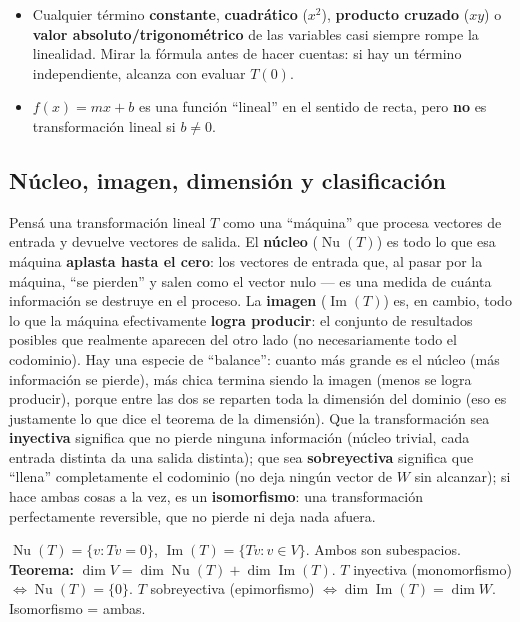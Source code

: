 \documentclass[11pt,a4paper]{article}
\begin{document}
\begin{atencion}
\begin{itemize}
    \item Cualquier término \textbf{constante}, \textbf{cuadrático} ($x^2$), \textbf{producto
    cruzado} ($xy$) o \textbf{valor absoluto/trigonométrico} de las variables casi siempre
    rompe la linealidad. Mirar la fórmula antes de hacer cuentas: si hay un término
    independiente, alcanza con evaluar $T(0)$.
    \item $f(x)=mx+b$ es una función ``lineal'' en el sentido de recta, pero \textbf{no}
    es transformación lineal si $b\neq0$.
\end{itemize}
\end{atencion}

\newpage
\subsection{Núcleo, imagen, dimensión y clasificación}

\begin{intuicion}
Pensá una transformación lineal $T$ como una ``máquina'' que procesa vectores de entrada
y devuelve vectores de salida. El \textbf{núcleo} ($\operatorname{Nu}(T)$) es todo lo que
esa máquina \textbf{aplasta hasta el cero}: los vectores de entrada que, al pasar por la
máquina, ``se pierden'' y salen como el vector nulo — es una medida de cuánta información
se destruye en el proceso. La \textbf{imagen} ($\operatorname{Im}(T)$) es, en cambio, todo
lo que la máquina efectivamente \textbf{logra producir}: el conjunto de resultados
posibles que realmente aparecen del otro lado (no necesariamente todo el codominio). Hay
una especie de ``balance'': cuanto más grande es el núcleo (más información se pierde),
más chica termina siendo la imagen (menos se logra producir), porque entre las dos se
reparten toda la dimensión del dominio (eso es justamente lo que dice el teorema de la
dimensión). Que la transformación sea \textbf{inyectiva} significa que no pierde ninguna
información (núcleo trivial, cada entrada distinta da una salida distinta); que sea
\textbf{sobreyectiva} significa que ``llena'' completamente el codominio (no deja ningún
vector de $W$ sin alcanzar); si hace ambas cosas a la vez, es un \textbf{isomorfismo}: una
transformación perfectamente reversible, que no pierde ni deja nada afuera.
\end{intuicion}

\begin{teoria}
$\operatorname{Nu}(T)=\{v: Tv=0\}$, $\operatorname{Im}(T)=\{Tv: v\in V\}$. Ambos son
subespacios. \textbf{Teorema:} $\dim V=\dim\operatorname{Nu}(T)+\dim\operatorname{Im}(T)$.
$T$ inyectiva (monomorfismo) $\Leftrightarrow \operatorname{Nu}(T)=\{0\}$. $T$ sobreyectiva
(epimorfismo) $\Leftrightarrow \dim\operatorname{Im}(T)=\dim W$. Isomorfismo = ambas.
\end{teoria}
\end{document}
